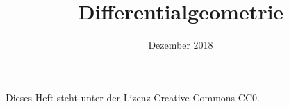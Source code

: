 \documentclass[a4paper,fleqn,11pt]{scrbook}
\title{Differentialgeometrie}
\date{Dezember 2018}
\theoremstyle{rmbox}
\numberwithin{definition}{chapter}
\numberwithin{theorem}{chapter}
\begin{document}
\thispagestyle{empty}

\maketitle

Dieses Heft steht unter der Lizenz Creative Commons CC0.

\tableofcontents




\end{document}
